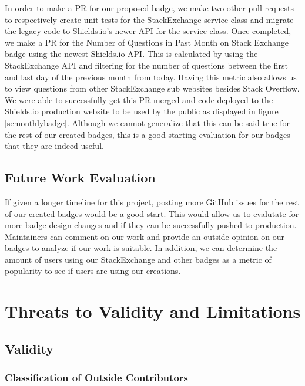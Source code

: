 \documentclass[12pt, letterpaper]{article}
\begin{document}
In order to make a PR for our proposed badge, we make two other pull requests to respectively
create unit tests for the StackExchange service class and migrate the legacy code to Shields.io's newer
API for the service class. Once completed, we make a PR for the Number of Questions in Past Month on Stack Exchange
badge using the newest Shields.io API. This is calculated by using the StackExchange API and filtering for the 
number of questions between the first and last day of the previous month from today. Having this metric also
allows us to view questions from other StackExchange sub websites besides Stack Overflow.
We were able to successfully get this PR merged and code deployed to the Shields.io \cite{shields} 
production website to be used by the public as displayed in figure \ref{semonthlybadge}. Although we cannot generalize that this can be said
true for the rest of our created badges, this is a good starting evaluation for our badges
that they are indeed useful. 

\subsection{Future Work Evaluation}
If given a longer timeline for this project, posting more GitHub issues for the rest of
our created badges would be a good start. This would allow us to evalutate for more badge design changes
and if they can be successfully pushed to production. Maintainers can comment on our work
and provide an outside opinion on our badges to analyze if our work is suitable. 
In addition, we can determine the amount of users using our StackExchange and other badges as
a metric of popularity to see if users are using our creations. 

\section{Threats to Validity and Limitations}

\subsection{Validity}
\subsubsection{Classification of Outside Contributors}
\end{document}
